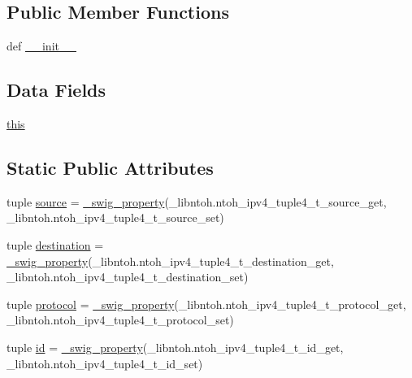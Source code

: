 \subsection*{Public Member Functions}
\begin{DoxyCompactItemize}
\item 
def \hyperlink{classlibntoh_1_1ntoh__ipv4__tuple4__t_ac775ee34451fdfa742b318538164070e}{\-\_\-\-\_\-init\-\_\-\-\_\-}
\end{DoxyCompactItemize}
\subsection*{Data Fields}
\begin{DoxyCompactItemize}
\item 
\hyperlink{classlibntoh_1_1ntoh__ipv4__tuple4__t_a05c09a5e9d53fa7adf0a7936038c2fa3}{this}
\end{DoxyCompactItemize}
\subsection*{Static Public Attributes}
\begin{DoxyCompactItemize}
\item 
tuple \hyperlink{classlibntoh_1_1ntoh__ipv4__tuple4__t_aa873026052cc3e5ba03877243fcb7ecd}{source} = \hyperlink{namespacelibntoh_ae6f5626f776538e0cdb00e75ca1c96c9}{\-\_\-swig\-\_\-property}(\-\_\-libntoh.\-ntoh\-\_\-ipv4\-\_\-tuple4\-\_\-t\-\_\-source\-\_\-get, \-\_\-libntoh.\-ntoh\-\_\-ipv4\-\_\-tuple4\-\_\-t\-\_\-source\-\_\-set)
\item 
tuple \hyperlink{classlibntoh_1_1ntoh__ipv4__tuple4__t_adaac82457baf1096d1c38cadf8123ce7}{destination} = \hyperlink{namespacelibntoh_ae6f5626f776538e0cdb00e75ca1c96c9}{\-\_\-swig\-\_\-property}(\-\_\-libntoh.\-ntoh\-\_\-ipv4\-\_\-tuple4\-\_\-t\-\_\-destination\-\_\-get, \-\_\-libntoh.\-ntoh\-\_\-ipv4\-\_\-tuple4\-\_\-t\-\_\-destination\-\_\-set)
\item 
tuple \hyperlink{classlibntoh_1_1ntoh__ipv4__tuple4__t_ae535ff0dd346855882bd298a9e22bbc1}{protocol} = \hyperlink{namespacelibntoh_ae6f5626f776538e0cdb00e75ca1c96c9}{\-\_\-swig\-\_\-property}(\-\_\-libntoh.\-ntoh\-\_\-ipv4\-\_\-tuple4\-\_\-t\-\_\-protocol\-\_\-get, \-\_\-libntoh.\-ntoh\-\_\-ipv4\-\_\-tuple4\-\_\-t\-\_\-protocol\-\_\-set)
\item 
tuple \hyperlink{classlibntoh_1_1ntoh__ipv4__tuple4__t_a0e43f6071072440917ee2dd8af07d251}{id} = \hyperlink{namespacelibntoh_ae6f5626f776538e0cdb00e75ca1c96c9}{\-\_\-swig\-\_\-property}(\-\_\-libntoh.\-ntoh\-\_\-ipv4\-\_\-tuple4\-\_\-t\-\_\-id\-\_\-get, \-\_\-libntoh.\-ntoh\-\_\-ipv4\-\_\-tuple4\-\_\-t\-\_\-id\-\_\-set)
\end{DoxyCompactItemize}



